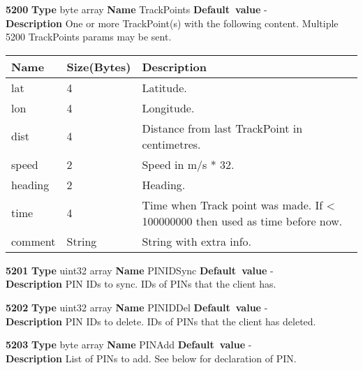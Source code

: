 \documentclass[a4paper]{article}
\begin{document}
\begin{list}{\textbf{ParamID}}{}
\item \textbf{5200} \textbf{Type} byte array \textbf{Name} TrackPoints
                 \textbf{Default~value} - \\
  \label{TrackPoints}
  \textbf{Description} One or more TrackPoint(s) with the following content. 
                       Multiple 5200 TrackPoints params may be sent.\\
  \begin{tabular}{|l|l|p{60mm}|}
    \hline
    Name   & Size(Bytes) & Description \\\hline
    lat    & 4           & Latitude. \\\hline
    lon    & 4           & Longitude.\\\hline
    dist   & 4           & Distance from last TrackPoint in 
                           centimetres.\\\hline
    speed  & 2           & Speed in m/s * 32. \\\hline
    heading& 2           & Heading. \\\hline
    time   & 4           & Time when Track point was made. If < 100000000 then
                           used as time before now. \\\hline
    comment& String      & String with extra info. \\\hline
  \end{tabular}
\item \textbf{5201} \textbf{Type} uint32 array \textbf{Name} PINIDSync
                 \textbf{Default~value} - \\
  \label{PINIDSync}
  \textbf{Description} PIN IDs to sync. IDs of PINs that the client has.
\item \textbf{5202} \textbf{Type} uint32 array \textbf{Name} PINIDDel
                 \textbf{Default~value} - \\
  \label{track_req:PINIDDel}
  \textbf{Description} PIN IDs to delete. IDs of PINs that the client has 
                       deleted.
\item \textbf{5203} \textbf{Type} byte array \textbf{Name} PINAdd
                 \textbf{Default~value} - \\
  \label{track_req:PINAdd}
  \textbf{Description} List of PINs to add. See below for declaration of PIN.\\

\end{list}
\end{document}
